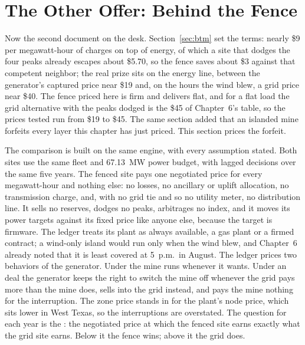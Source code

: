 \section{The Other Offer: Behind the Fence}
\label{sec:stack-fence}

Now the second document on the desk. Section~\ref{sec:btm} set the terms: nearly \$9 per megawatt-hour of charges on top of energy, of which a site that dodges the four peaks already escapes about \$5.70, so the fence saves about \$3 against that competent neighbor; the real prize sits on the energy line, between the generator's captured price near \$19 and, on the hours the wind blew, a grid price near \$40. The fence priced here is firm and delivers flat, and for a flat load the grid alternative with the peaks dodged is the \$45 of Chapter~6's table, so the prices tested run from \$19 to \$45. The same section added that an islanded mine forfeits every layer this chapter has just priced. This section prices the forfeit. %

The comparison is built on the same engine, with every assumption stated. Both sites use the same fleet and 67.13~MW power budget, with lagged decisions over the same five years. The fenced site pays one negotiated price for every megawatt-hour and nothing else: no losses, no ancillary or uplift allocation, no transmission charge, and, with no grid tie and so no utility meter, no distribution line. It sells no reserves, dodges no peaks, arbitrages no index, and it moves its power targets against its fixed price like anyone else, because the target is firmware. The ledger treats its plant as always available, a gas plant or a firmed contract; a wind-only island would run only when the wind blew, and Chapter~6 already noted that it is least covered at 5~p.m.\ in August. The ledger prices two behaviors of the generator. Under  the mine runs whenever it wants. Under an  deal the generator keeps the right to switch the mine off whenever the grid pays more than the mine does, sells into the grid instead, and pays the mine nothing for the interruption. The zone price stands in for the plant's node price, which sits lower in West Texas, so the interruptions are overstated. %
The question for each year is the : the negotiated price at which the fenced site earns exactly what the grid site earns. Below it the fence wins; above it the grid does.

